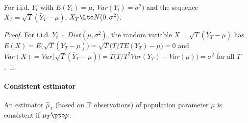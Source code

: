 \begin{theorem}
For i.i.d. $Y_t$ with $E(Y_t) = \mu, \ Var(Y_t)=\sigma^2)$ and the sequence $X_T = \sqrt{T}(\bar{Y}_T - \mu)$, $X_T \Lto N(0,\sigma^2)$.
\end{theorem}
\begin{proof}
For i.i.d. $Y_t \sim Dist(\mu,\sigma^2)$, the random variable $X = \sqrt{T}(\bar{Y}_T - \mu)$ has $E(X) = E\big(\sqrt{T}(\bar{Y}_T - \mu)\big) = \sqrt{T} \big( T/T E(Y_T) - \mu \big) = 0$ and $Var(X) = Var\big(\sqrt{T}(\bar{Y}_T - \mu)\big) = T \Big(T/T^2 Var(Y_T) - Var(\mu) \Big) = \sigma^2$ for all $T$.
\end{proof}

\paragraph{Consistent estimator}
An estimator $\hat{\mu}_T$ (based on T observations) of population parameter $\mu$ is consistent if $\mu_T \pto \mu$.
